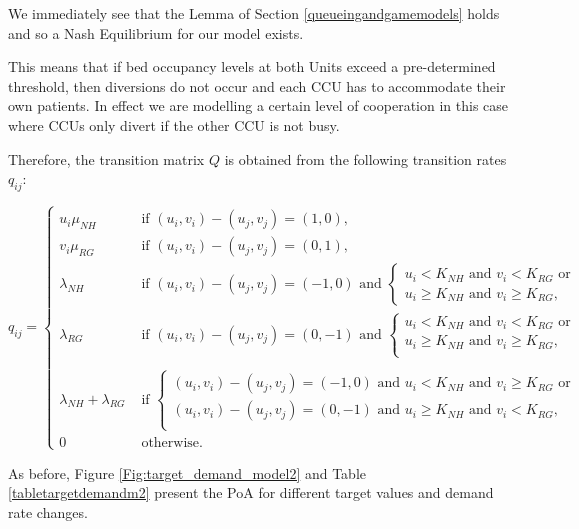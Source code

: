 \documentclass{article}
\begin{document}
We immediately see that the Lemma of Section \ref{queueingandgamemodels} holds and so a Nash Equilibrium for our model exists.

This means that if bed occupancy levels at both Units exceed a pre-determined threshold, then diversions do not occur and each CCU has to accommodate their own patients.
In effect we are modelling a certain level of cooperation in this case where CCUs only divert if the other CCU is not busy.

Therefore, the transition matrix $Q$ is obtained from the following transition rates $q_{ij}$:

\begin{equation}
q_{ij}=\begin{cases} u_i\mu_{NH} & \text{ if  } (u_i,v_i)-(u_j,v_j)=(1,0),\\
 v_i\mu_{RG} & \text{ if  } (u_i,v_i)-(u_j,v_j)=(0,1),\\
 \lambda_{NH} & \text{ if  } (u_i,v_i)-(u_j,v_j)=(-1,0) \text{ and }\left\{\begin{array}{l} u_i<K_{NH} \text{ and } v_i<K_{RG}  \text{ or } \\        u_i  \geq K_{NH} \text{ and } v_i  \geq K_{RG},\end{array}\right.\\
 \lambda_{RG} & \text{ if  } (u_i,v_i)-(u_j,v_j)=(0,-1) \text{ and }\left\{\begin{array}{l}u_i< K_{NH}\text{ and }v_i<K_{RG}\text{ or }\\u_i\geq K_{NH}\text{ and }v_i\geq K_{RG}, \\\end{array}\right.\\\\
\lambda_{NH}+\lambda_{RG} & \text{ if  } \left\{\begin{array}{l} (u_i,v_i)-(u_j,v_j)=(-1,0) \text{ and } u_i<K_{NH} \text{ and } v_i \geq K_{RG} \text{ or }\\ (u_i,v_i)-(u_j,v_j)=(0,-1) \text{ and } u_i \geq K_{NH} \text{ and } v_i < K_{RG}, \\\end{array}\right.\\
0 & \text{ otherwise}.
\end{cases}
\end{equation}


As before, Figure \ref{Fig:target_demand_model2} and Table \ref{tabletargetdemandm2} present the PoA for different target values and demand rate changes.
\end{document}

